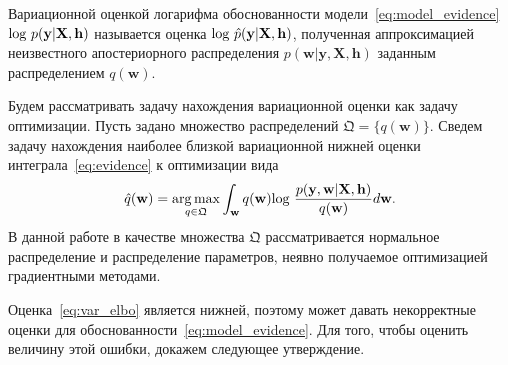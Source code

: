 {
\begin{defin} Вариационной оценкой логарифма обоснованности модели~\eqref{eq:model_evidence} $\textnormal{log}~p(\mathbf{y}|\mathbf{X},\mathbf{h})$ называется оценка $\textnormal{log}~\hat{p}(\mathbf{y}|\mathbf{X},\mathbf{h})$, полученная аппроксимацией неизвестного апостериорного распределения $p(\mathbf{w}| \mathbf{y}, \mathbf{X}, \mathbf{h})$ заданным распределением $q(\mathbf{w})$.
\end{defin}
}


Будем рассматривать задачу нахождения вариационной оценки как задачу оптимизации. Пусть задано множество распределений $\mathfrak{Q} =\{q(\mathbf{w})\}$. Сведем задачу нахождения наиболее близкой вариационной нижней оценки интеграла~\eqref{eq:evidence} к оптимизации вида
\[
     \hat{q}(\mathbf{w}) = \operatorname*{arg\,max}_{q \in \mathfrak{Q}}  \int_{\mathbf{w}} q(\mathbf{w})\textnormal{log}~\frac{p(\mathbf{y},\mathbf{w}|\mathbf{X},\mathbf{h})}{q(\mathbf{w})}d\mathbf{w}.
\]  
В данной работе в качестве множества $\mathfrak{Q}$ рассматривается нормальное распределение и распределение параметров, неявно получаемое оптимизацией градиентными методами. 

Оценка~\eqref{eq:var_elbo} является нижней, поэтому может давать некорректные оценки для обоснованности~\eqref{eq:model_evidence}. Для того, чтобы оценить величину этой ошибки, докажем следующее утверждение.

